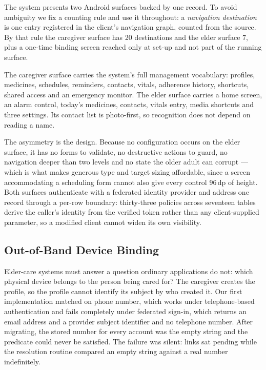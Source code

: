 \documentclass[runningheads,a4paper]{llncs}
\begin{document}
The system presents two Android surfaces backed by one record. To avoid ambiguity we fix a
counting rule and use it throughout: a \emph{navigation destination} is one entry registered
in the client's navigation graph, counted from the source. By that rule the caregiver
surface has 20 destinations and the elder surface 7, plus a one-time binding screen reached
only at set-up and not part of the running surface.

The caregiver surface carries the system's full management vocabulary: profiles,
medicines, schedules, reminders, contacts, vitals, adherence history, shortcuts, shared
access and an emergency monitor. The elder surface carries a home screen, an alarm control, today's
medicines, contacts, vitals entry, media shortcuts and three settings. Its contact list is
photo-first, so recognition does not depend on reading a name.

The asymmetry is the design. Because no configuration occurs on the elder surface, it has
no forms to validate, no destructive actions to guard, no navigation deeper than two levels
and no state the older adult can corrupt --- which is what makes generous type and target
sizing affordable, since a screen accommodating a scheduling form cannot also give every
control 96\,dp of height. Both surfaces authenticate with a federated identity provider and
address one record through a per-row boundary: thirty-three policies across seventeen
tables derive the caller's identity from the verified token rather than any client-supplied
parameter, so a modified client cannot widen its own visibility.

\subsection{Out-of-Band Device Binding}
\label{sec:binding}

Elder-care systems must answer a question ordinary applications do not: which physical
device belongs to the person being cared for? The caregiver creates the profile, so the
profile cannot identify its subject by who created it. Our first implementation matched on
phone number, which works under telephone-based authentication and fails completely under
federated sign-in, which returns an email address and a provider subject identifier and no
telephone number. After migrating, the stored number for every account was the empty string
and the predicate could never be satisfied. The failure was silent: links sat pending while
the resolution routine compared an empty string against a real number indefinitely.
\end{document}
